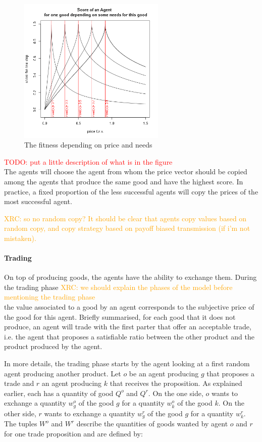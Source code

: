 \documentclass{wscpaperproc}
\newcommand{\memo}[2]{\textcolor{#1}{#2}}
\newcommand{\todo}[1]{\memo{red}{TODO: #1\\}}
\newcommand{\xrc}[1]{\memo{orange}{XRC: #1\\}}
\begin{document}
\begin{figure}[htp]
	\begin{center}
		\includegraphics[width=7cm]{img/fitness.png}
	\end{center}
	\caption{The fitness depending on price and needs}
	\label{fig:fit}
\end{figure}

\todo{put a little description of what is in the figure}
The agents will choose the agent from whom the price vector should be copied among the agents that produce the same good and have the highest score. In practice, a fixed proportion of the less successful agents will copy the prices of the most successful agent. 

\xrc{so no random copy? It should be clear that agents copy values based on random copy, and copy strategy based on payoff biased transmission (if i'm not mistaken).}

\paragraph{Trading} 


On top of producing goods, the agents have the ability to exchange them. During the trading phase \xrc{we should explain the phases of the model before mentioning the trading phase} the value associated to a good by an agent corresponds to the subjective price of the good for this agent. Briefly summarised, for each good that it does not produce, an agent will trade with the first parter that offer an acceptable trade, i.e. the agent that proposes a satisfiable ratio between the other product and the product produced by the agent. 

In more details, the trading phase starts by the agent looking at a first random agent producing another product. 
Let $o$ be an agent producing $g$ that proposes a trade and $r$ an agent producing $k$ that receives the proposition. As explained earlier, each has a quantity of good $Q^o$ and $Q^r$. On the one side, $o$ wants to exchange a quantity $w_g^o$ of the good $g$ for a quantity $w_k^o$ of the good $k$. On the other side, $r$ wants to exchange a quantity $w_g^r$ of the good $g$ for a quantity $w_k^r$. The tuples $W^o$ and $W^r$ describe the quantities of goods wanted by agent $o$ and $r$ for one trade proposition and are defined by:  
\end{document}
